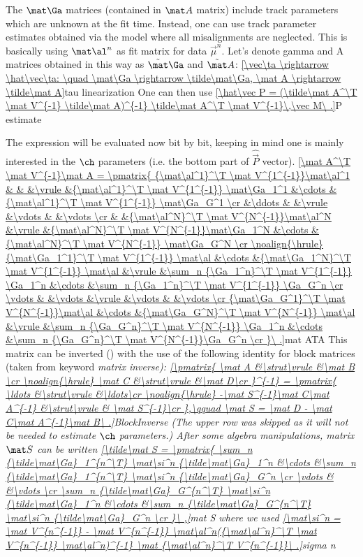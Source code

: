 The $\mat\Ga$ matrices (contained in $\mat A$ matrix) include track parameters which are unknown at the fit time. Instead, one can use track parameter estimates obtained via the model where all misalignments are neglected. This is basically using $\mat \al^n$ as fit matrix for data $\vec \mu^n$. Let's denote gamma and A matrices obtained in this way as $\tilde\mat\Ga$ and $\tilde\mat A$:
\eqref{\vec\ta \rightarrow \hat\vec\ta: \quad \mat\Ga \rightarrow \tilde\mat\Ga, \mat A \rightarrow \tilde\mat A}{tau linearization}
 One can then use
\eqref{\hat\vec P = (\tilde\mat A^\T \mat V^{-1} \tilde\mat A)^{-1} \tilde\mat A^\T \mat V^{-1}\,\vec M\ .}{P estimate}

The \rhs expression will be evaluated now bit by bit, keeping in mind one is mainly interested in the $\ch$ parameters (i.e. the bottom part of $\hat\vec P$ vector).
\eqref{\mat A^\T \mat V^{-1}\mat A = \pmatrix{
{\mat\al^1}^\T \mat V^{1^{-1}}\mat\al^1	&		&						&\vrule	&{\mat\al^1}^\T \mat V^{1^{-1}} \mat\Ga_1^1	&\cdots	&{\mat\al^1}^\T \mat V^{1^{-1}} \mat\Ga_G^1	\cr
					&\ddots	&						&\vrule	&\vdots					&		&\vdots					\cr
					&		&{\mat\al^N}^\T \mat V^{N^{-1}}\mat\al^N		&\vrule	&{\mat\al^N}^\T \mat V^{N^{-1}}\mat\Ga_1^N	&\cdots	&{\mat\al^N}^\T \mat V^{N^{-1}} \mat\Ga_G^N	\cr
\noalign{\hrule}
{\mat\Ga_1^1}^\T \mat V^{1^{-1}} \mat\al	&\cdots	&{\mat\Ga_1^N}^\T \mat V^{1^{-1}} \mat\al	&\vrule	&\sum_n {\Ga_1^n}^\T \mat V^{1^{-1}} \Ga_1^n	&\cdots	&\sum_n {\Ga_1^n}^\T \mat V^{1^{-1}} \Ga_G^n	\cr
\vdots				&		&\vdots					&\vrule	&\vdots					&		&\vdots					\cr
{\mat\Ga_G^1}^\T \mat V^{N^{-1}}\mat\al	&\cdots	&{\mat\Ga_G^N}^\T \mat V^{N^{-1}} \mat\al	&\vrule	&\sum_n {\Ga_G^n}^\T \mat V^{N^{-1}} \Ga_1^n	&\cdots	&\sum_n {\Ga_G^n}^\T \mat V^{N^{-1}}\Ga_G^n	\cr
}\ .}{mat ATA}
This matrix can be inverted () with the use of the following identity for block matrices (taken from  keyword \em{matrix inverse}): 
\eqref{\pmatrix{
\mat A	&\strut\vrule	&\mat B	\cr
\noalign{\hrule}
\mat C	&\strut\vrule	&\mat D\cr
}^{-1} = \pmatrix{
\ldots							&\strut\vrule	&\ldots\cr
\noalign{\hrule}
-\mat S^{-1}\mat C\mat A^{-1}	&\strut\vrule	& \mat S^{-1}\cr
},\qquad \mat S = \mat D - \mat C\mat A^{-1}\mat B\ .}{BlockInverse}
(The upper row was skipped as it will not be needed to estimate $\ch$ parameters.) After some algebra manipulations, matrix $\mat S$ can be written
\eqref{\tilde\mat S = \pmatrix{
\sum_n {\tilde\mat\Ga}_1^{n^\T} \mat\si^n {\tilde\mat\Ga}_1^n	&\cdots	&\sum_n {\tilde\mat\Ga}_1^{n^\T} \mat\si^n {\tilde\mat\Ga}_G^n	\cr
\vdots								&		&\vdots									\cr
\sum_n {\tilde\mat\Ga}_G^{n^\T} \mat\si^n {\tilde\mat\Ga}_1^n	&\cdots	&\sum_n {\tilde\mat\Ga}_G^{n^\T} \mat\si^n {\tilde\mat\Ga}_G^n	\cr
}\ ,}{mat S}
where we used
\eqref{\mat\si^n = \mat V^{n^{-1}} - \mat V^{n^{-1}} \mat\al^n({\mat\al^n}^\T \mat V^{n^{-1}} \mat\al^n)^{-1} \mat {\mat\al^n}^\T V^{n^{-1}}\ .}{sigma n}

